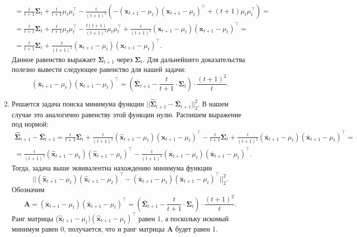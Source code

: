 \documentclass{article}
\begin{document}
\begin{enumerate}
\begin{gather*}
		= \frac{t}{t+1}\mathbf{\Sigma}_t + \frac{t}{t+1}\mu_{t} \mu_{t}^\intercal - \frac{t}{(t+1)^2} \left( -(\mathbf{x}_{t+1}-\mu_t)(\mathbf{x}_{t+1}-\mu_t)^\intercal + (t+1)\mu_{t} \mu_{t}^\intercal \right) =\\
		= \frac{t}{t+1}\mathbf{\Sigma}_t + \frac{t}{t+1}\mu_{t} \mu_{t}^\intercal - \frac{t(t+1)}{(t+1)^2}\mu_{t} \mu_{t}^\intercal + \frac{t}{(t+1)^2}(\mathbf{x}_{t+1}-\mu_t)(\mathbf{x}_{t+1}-\mu_t)^\intercal =\\
		= \frac{t}{t+1}\mathbf{\Sigma}_t + \frac{t}{(t+1)^2}(\mathbf{x}_{t+1}-\mu_t)(\mathbf{x}_{t+1}-\mu_t)^\intercal.
	\end{gather*}
	Данное равенство выражает $\mathbf{\Sigma}_{t+1}$ через $\mathbf{\Sigma}_t$. Для дальнейшего доказательства полезно вывести следующее равенство для нашей задачи: \[(\bar{\mathbf{x}}_{t+1}-\mu_t)(\bar{\mathbf{x}}_{t+1}-\mu_t)^\intercal = \left(\bar{\mathbf{\Sigma}}_{t+1} - \frac{t}{t+1} \cdot \mathbf{\Sigma}_t \right) \cdot \frac{(t+1)^2}{t}.\]
	
	\item Решается задача поиска минимума функции $||\hat{\mathbf{\Sigma}}_{t+1} - \bar{\mathbf{\Sigma}}_{t+1}||_2^2$. В нашем случае это аналогично равенству этой функции нулю. Распишем выражение под нормой:
	\begin{gather*}
		\hat{\mathbf{\Sigma}}_{t+1} - \bar{\mathbf{\Sigma}}_{t+1} = \frac{t}{t+1}\mathbf{\Sigma}_t + \frac{t}{(t+1)^2}(\hat{\mathbf{x}}_{t+1}-\mu_t)(\hat{\mathbf{x}}_{t+1}-\mu_t)^\intercal - \frac{t}{t+1}\mathbf{\Sigma}_t + \frac{t}{(t+1)^2}(\bar{\mathbf{x}}_{t+1}-\mu_t)(\bar{\mathbf{x}}_{t+1}-\mu_t)^\intercal =\\
		=\frac{t}{(t+1)^2}(\hat{\mathbf{x}}_{t+1}-\mu_t)(\hat{\mathbf{x}}_{t+1}-\mu_t)^\intercal -\frac{t}{(t+1)^2}(\bar{\mathbf{x}}_{t+1}-\mu_t)(\bar{\mathbf{x}}_{t+1}-\mu_t)^\intercal.
 	\end{gather*}
 	Тогда, задача выше эквивалентна нахождению минимума функции \[||(\hat{\mathbf{x}}_{t+1}-\mu_t)(\hat{\mathbf{x}}_{t+1}-\mu_t)^\intercal-(\bar{\mathbf{x}}_{t+1}-\mu_t)(\bar{\mathbf{x}}_{t+1}-\mu_t)^\intercal||_2^2.\]
 	Обозначим \[\mathbf{A} = (\bar{\mathbf{x}}_{t+1}-\mu_t)(\bar{\mathbf{x}}_{t+1}-\mu_t)^\intercal = \left(\bar{\mathbf{\Sigma}}_{t+1} - \frac{t}{t+1} \cdot \mathbf{\Sigma}_t \right) \cdot \frac{(t+1)^2}{t}.\]
 	Ранг матрицы ($\hat{\mathbf{x}}_{t+1}-\mu_t)(\hat{\mathbf{x}}_{t+1}-\mu_t)^\intercal$ равен 1, а поскольку искомый минимум равен 0, получается, что и ранг матрицы $\mathbf{A}$ будет равен 1.
 	

\end{enumerate}
\end{document}

